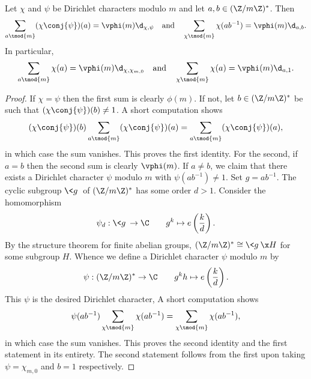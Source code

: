 \documentclass[12pt]{article}
\begin{document}
      \begin{proposition*}
      Let \(\chi\) and \(\psi\) be Dirichlet characters modulo \(m\) and let \(a,b \in (\Z/m\Z)^{\ast}\). Then
      \[
        \sum_{a \tmod{m}}(\chi\conj{\psi})(a) = \vphi(m)\d_{\chi,\psi} \quad \text{and} \quad \sum_{\chi \tmod{m}}\chi(ab^{-1}) = \vphi(m)\d_{a,b}.
      \]
      In particular,
      \[
        \sum_{a \tmod{m}}\chi(a) = \vphi(m)\d_{\chi,\chi_{m,0}} \quad \text{and} \quad \sum_{\chi \tmod{m}}\chi(a) = \vphi(m)\d_{a,1}.
      \]
      \end{proposition*}
      \begin{proof}
        If \(\chi = \psi\) then the first sum is clearly \(\phi(m)\). If not, let \(b \in (\Z/m\Z)^{\ast}\) be such that \((\chi\conj{\psi})(b) \neq 1\). A short computation shows
        \[
          (\chi\conj{\psi})(b)\sum_{a \tmod{m}}(\chi\conj{\psi})(a) = \sum_{a \tmod{m}}(\chi\conj{\psi})(a),
        \]
        in which case the sum vanishes. This proves the first identity. For the second, if \(a = b\) then the second sum is clearly \(\vphi(m)\). If \(a \neq b\), we claim that there exists a Dirichlet character \(\psi\) modulo \(m\) with \(\psi(ab^{-1}) \neq 1\). Set \(g = ab^{-1}\). The cyclic subgroup \(\<g\>\) of \((\Z/m\Z)^{\ast}\) has some order \(d > 1\). Consider the homomorphism
        \[
          \psi_{d}:\<g\> \to \C \qquad g^{k} \mapsto e\left(\frac{k}{d}\right).
        \]
        By the structure theorem for finite abelian groups, \((\Z/m\Z)^{\ast} \cong \<g\> \x H\) for some subgroup \(H\). Whence we define a Dirichlet character \(\psi\) modulo \(m\) by
        \[
          \psi:(\Z/m\Z)^{\ast} \to \C \qquad g^{k}h \mapsto e\left(\frac{k}{d}\right).
        \]
        This \(\psi\) is the desired Dirichlet character, A short computation shows
        \[
          \psi(ab^{-1})\sum_{\chi \tmod{m}}\chi(ab^{-1}) = \sum_{\chi \tmod{m}}\chi(ab^{-1}),
        \]
        in which case the sum vanishes. This proves the second identity and the first statement in its entirety. The second statement follows from the first upon taking \(\psi = \chi_{m,0}\) and \(b = 1\) respectively.
      \end{proof}
\end{document}
